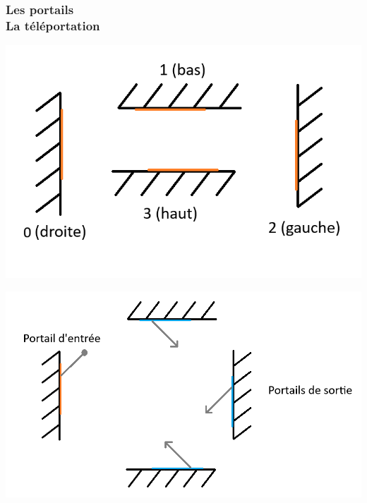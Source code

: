 \documentclass{beamer}
\begin{document}
\begin{frame}
    \frametitle{Les portails \\
                \small La téléportation}
    \begin{minipage}{0.48\textwidth}
		\includegraphics[width=\linewidth]{images/portal1.png}
	\end{minipage}
	\begin{minipage}{0.48\textwidth}
		\includegraphics[width=\linewidth]{images/portal2.png}
	\end{minipage}
\end{frame}
\end{document}
